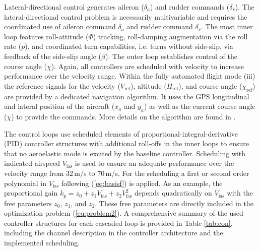 \documentclass[aerospace,article,submit,moreauthors,pdftex,10pt,a4paper]{Definitions/mdpi}
\begin{document}
Lateral-directional control generates aileron ($\delta_a$) and rudder commands ($\delta_r$). 
The lateral-directional control problem is necessarily multivariable and requires the coordinated use of aileron command $\delta_{a}$ and rudder command $\delta_{r}$. The most inner loop features roll-attitude ($\Phi$) tracking, roll-damping augmentation via the roll rate ($p$), and coordinated turn capabilities, i.e. turns without side-slip, via feedback of the side-slip angle ($\beta$). The outer loop establishes control of the course angle ($\chi$). Again, all controllers are scheduled with velocity to increase performance over the velocity range. Within the fully automated flight mode (iii) the reference signals for the velocity ($V_\text{ref}$), altitude ($H_\text{ref}$), and course angle ($\chi_\text{ref}$) are provided by a dedicated navigation algorithm. It uses the GPS longitudinal and lateral position of the aircraft ($x_a$ and $y_a$) as well as the current course angle  ($\chi$) to provide the commands.  More details on the algorithm are found in \cite{Ossmann19a}.


The control loops use scheduled elements of proportional-integral-derivative (PID) controller structures with additional roll-offs in the inner loops to ensure that no aeroelastic mode is excited by the baseline controller. Scheduling with indicated airspeed $V_{\text{ias}}$ is used to ensure an adequate performance over the velocity range from 32\,m/s to 70\,m/s. For the scheduling a first or second order polynomial in  $V_{\text{ias}}$ following (\ref{eq:basisf}) is applied. As an example, the proportional gain $k_p = z_0 + z_1 V_{\text{ias}} + z_2 V^2_{\text{ias}}$ depends quadratically on  $V_{\text{ias}}$ with the free parameters $z_0$, $z_1$, and $z_2$. These free parameters are directly included in the optimization problem (\ref{eq:problem2}). A comprehensive summary of the used controller structures for each cascaded  loop is provided in Table \ref{tab:con}, including the channel description in the controller architecture and the implemented scheduling. 
\end{document}
